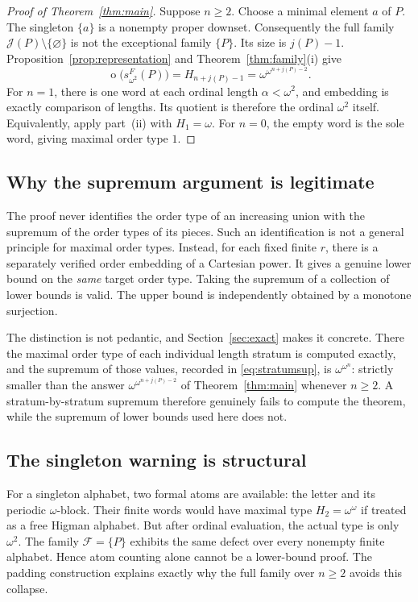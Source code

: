 \documentclass[11pt,a4paper]{article}
\numberwithin{equation}{section}
\theoremstyle{definition}
\theoremstyle{remark}
\newcommand{\mot}{\mathop{o}}
\newcommand{\J}{\mathcal J}
\newcommand{\F}{\mathcal F}
\newcommand{\Wordspace}[1]{s_{\omega^2}^{F}(#1)}
\begin{document}
\begin{proof}[Proof of Theorem~\ref{thm:main}]
Suppose $n\ge2$. Choose a minimal element $a$ of $P$. The singleton
$\{a\}$ is a nonempty proper downset. Consequently the full family
$\J(P)\setminus\{\varnothing\}$ is not the exceptional family $\{P\}$.
Its size is $j(P)-1$. Proposition~\ref{prop:representation} and
Theorem~\ref{thm:family}(i) give
\[
 \mot\bigl(\Wordspace P\bigr)
 =H_{n+j(P)-1}=\omega^{\omega^{n+j(P)-2}}.
\]
For $n=1$, there is one word at each ordinal length $\alpha<\omega^2$, and
embedding is exactly comparison of lengths. Its quotient is therefore the
ordinal $\omega^2$ itself. Equivalently, apply part~(ii) with $H_1=\omega$.
For $n=0$, the empty word is the sole word, giving maximal order type $1$.
\end{proof}

\subsection{Why the supremum argument is legitimate}
\label{sec:supremum}
The proof never identifies the order type of an increasing union with the
supremum of the order types of its pieces. Such an identification is not a
general principle for maximal order types. Instead, for each fixed finite
$r$, there is a separately verified order embedding of a Cartesian power.
It gives a genuine lower bound on the \emph{same} target order type.
Taking the supremum of a collection of lower bounds is valid. The upper
bound is independently obtained by a monotone surjection.

The distinction is not pedantic, and Section~\ref{sec:exact} makes it
concrete. There the maximal order type of each individual length stratum is
computed exactly, and the supremum of those values, recorded in
\eqref{eq:stratumsup}, is $\omega^{\omega^n}$: strictly smaller than the
answer $\omega^{\omega^{n+j(P)-2}}$ of Theorem~\ref{thm:main} whenever
$n\ge2$. A stratum-by-stratum supremum therefore genuinely fails to compute
the theorem, while the supremum of lower bounds used here does not.

\subsection{The singleton warning is structural}
\label{sec:singleton}
For a singleton alphabet, two formal atoms are available: the letter and
its periodic $\omega$-block. Their finite words would have maximal type
$H_2=\omega^\omega$ if treated as a free Higman alphabet. But after ordinal
evaluation, the actual type is only $\omega^2$. The family
$\F=\{P\}$ exhibits the same defect over every nonempty finite alphabet.
Hence atom counting alone cannot be a lower-bound proof. The padding
construction explains exactly why the full family over $n\ge2$ avoids this
collapse.
\end{document}
